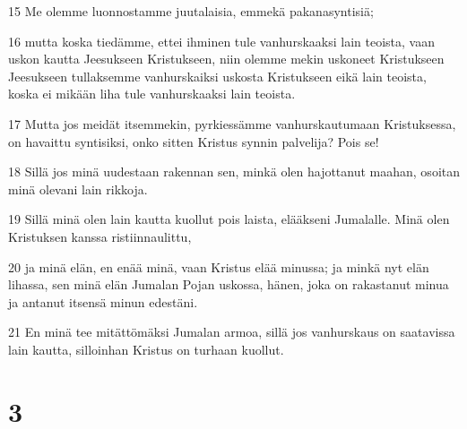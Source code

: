 \par 15 Me olemme luonnostamme juutalaisia, emmekä pakanasyntisiä;
\par 16 mutta koska tiedämme, ettei ihminen tule vanhurskaaksi lain teoista, vaan uskon kautta Jeesukseen Kristukseen, niin olemme mekin uskoneet Kristukseen Jeesukseen tullaksemme vanhurskaiksi uskosta Kristukseen eikä lain teoista, koska ei mikään liha tule vanhurskaaksi lain teoista.
\par 17 Mutta jos meidät itsemmekin, pyrkiessämme vanhurskautumaan Kristuksessa, on havaittu syntisiksi, onko sitten Kristus synnin palvelija? Pois se!
\par 18 Sillä jos minä uudestaan rakennan sen, minkä olen hajottanut maahan, osoitan minä olevani lain rikkoja.
\par 19 Sillä minä olen lain kautta kuollut pois laista, elääkseni Jumalalle. Minä olen Kristuksen kanssa ristiinnaulittu,
\par 20 ja minä elän, en enää minä, vaan Kristus elää minussa; ja minkä nyt elän lihassa, sen minä elän Jumalan Pojan uskossa, hänen, joka on rakastanut minua ja antanut itsensä minun edestäni.
\par 21 En minä tee mitättömäksi Jumalan armoa, sillä jos vanhurskaus on saatavissa lain kautta, silloinhan Kristus on turhaan kuollut.

\chapter{3}

